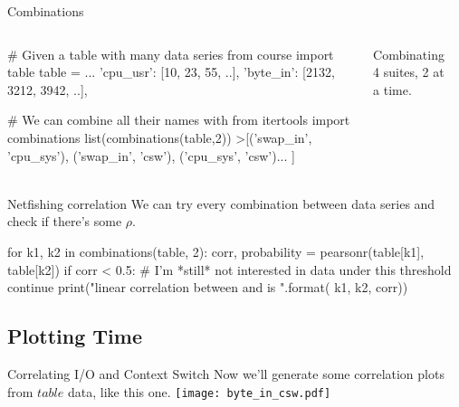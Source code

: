 \begin{pyframe}{Combinations } %
\begin{columns}
\begin{pycode}
# Given a table with many data series
from course import table
table = {...
  'cpu_usr': [10, 23, 55, ..],
  'byte_in': [2132, 3212, 3942, ..], }

# We can combine all their names with
from itertools import combinations
list(combinations(table,2))
>[('swap_in', 'cpu_sys'),
 ('swap_in', 'csw'),  ('cpu_sys', 'csw')... ]








\end{pycode}
Combinating 4 suites, 2 at a time.\\
\begin{center}
\\
\hearts \spades \\
\hearts \clubs \\
\hearts \diamonds \\
\spades \clubs \\
\spades \diamonds \\
\clubs \diamonds \\
\end{center}
\end{columns}
\end{pyframe}


\begin{pyframe}{Netfishing correlation}
We can try every combination between data series and check if there's some $\rho$.
\begin{pycode}
for k1, k2 in combinations(table, 2):
  corr, probability = pearsonr(table[k1], table[k2])
  if corr < 0.5:
    # I'm *still* not interested in data under this threshold
    continue
  print("linear correlation between {} and {} is {}".format(
    k1, k2, corr))

\end{pycode}
\end{pyframe}

\subsection{Plotting Time}
\begin{pyframe}{Correlating I/O and Context Switch}
{\footnotesize Now we'll generate some correlation plots from $table$ data, like this one.}
\texttt{[image: byte\_in\_csw.pdf]}
\end{pyframe}


